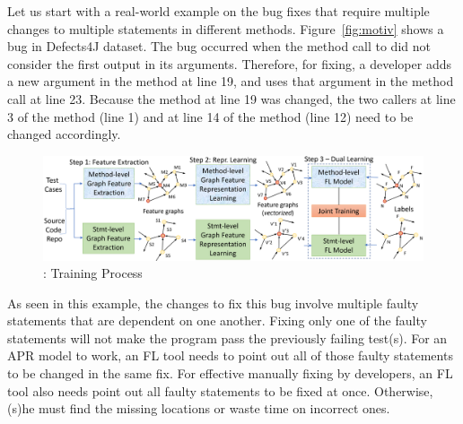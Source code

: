 Let us start with a real-world example on the bug fixes that
require multiple changes to multiple statements in different methods.
Figure~\ref{fig:motiv} shows a bug in Defects4J dataset. The bug
occurred when the method call to  did not
consider the first output in its arguments. Therefore, for fixing, a
developer adds a new argument in the method  at line
19, and uses that argument in the method call  at line 23. Because the method  at
line 19 was changed, the two callers at line 3 of the method
 (line 1) and at line 14 of the method 
(line 12) need to be changed accordingly.




\begin{figure}[t]
	\centering
	\includegraphics[width=5.45in]{graphs/overview-training.png}
        \vspace{-8pt}
	\caption{{\tool}: Training Process}
        \label{train-overview}
\end{figure}

 As seen in
this example, the changes to fix this bug involve multiple faulty
statements that are dependent on one another. Fixing only one of the
faulty statements will not make the program pass the previously
failing test(s). For an APR model to work, an FL tool needs to point
out all of those faulty statements to be changed in the same fix. For
effective manually fixing by developers, an FL tool also needs point
out all faulty statements to be fixed at once. Otherwise, (s)he must
find the missing locations or waste time on incorrect ones.

